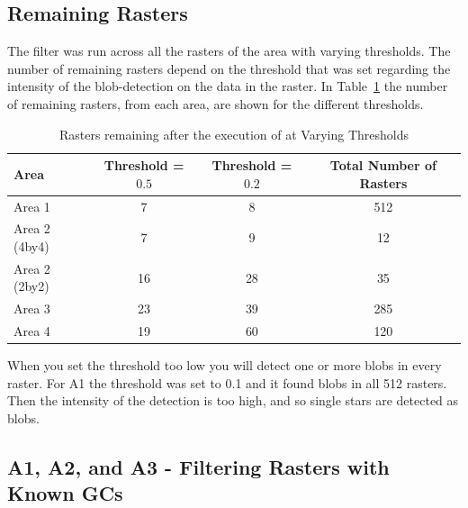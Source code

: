 \subsection{Remaining Rasters}
The \blobdog{} filter was run across all the rasters of the area with varying
thresholds. The number of remaining rasters depend on the threshold that was set
regarding the intensity of the blob-detection on the data in the raster. In
Table~\ref{tb:number-of-remaining-rasters} the number of remaining rasters, from each area, are shown for the different thresholds.

\begin{table}[H]
    \centering
    \caption{Rasters remaining after the execution of \blobdog{} at Varying Thresholds}
    \label{tb:number-of-remaining-rasters}
    \begin{tabular}{l c c c}
        \toprule
        Area          & Threshold = $0.5$ & Threshold = $0.2$ & Total Number of Rasters \\
        \midrule
        Area 1        & 7                 & 8                 & 512                     \\
        Area 2 (4by4) & 7                 & 9                 & 12                      \\
        Area 2 (2by2) & 16                & 28                & 35                      \\
        Area 3        & 23                & 39                & 285                     \\
        Area 4        & 19                & 60                & 120                     \\
        \bottomrule
    \end{tabular}
\end{table}

When you set the threshold too low you will detect one or more blobs in every raster. For A1 the threshold was set to 0.1 and it found blobs in all 512 rasters. Then the intensity of the detection is too high, and so single stars are detected as blobs.

\subsection{A1, A2, and A3 - Filtering Rasters with Known GCs}

